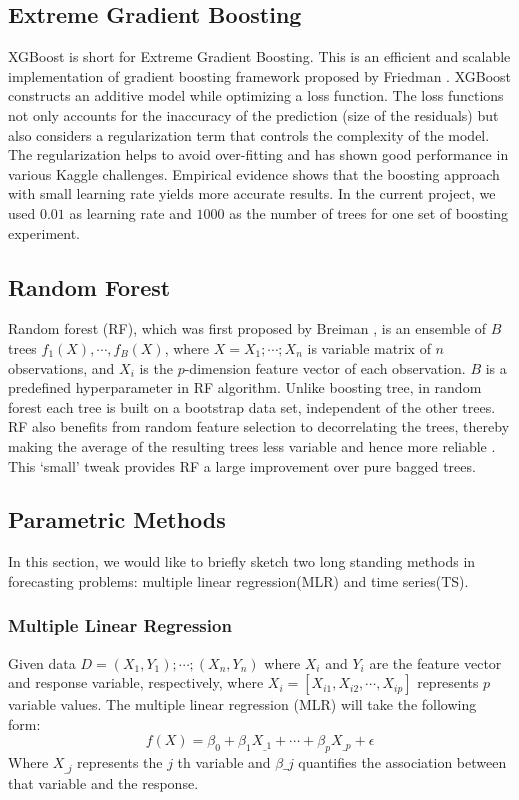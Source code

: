 \documentclass{llncs}
\begin{document}
\subsection{Extreme Gradient Boosting}
XGBoost \cite{Chen2016} is short for Extreme Gradient Boosting. This is an efficient and scalable implementation of gradient boosting framework proposed by Friedman \cite{Friedman2001}. XGBoost constructs an additive model while optimizing a loss function. The loss functions not only accounts for the inaccuracy of the prediction (size of the residuals) but also considers a regularization term that controls the complexity of the model. The regularization helps to avoid over-fitting and has shown good performance in various Kaggle challenges. Empirical evidence shows that the boosting approach with small learning rate yields more accurate results\cite{Chen2016}. In the current project, we used $0.01$ as learning rate and $1000$ as the number of trees for one set of boosting experiment.


\subsection{Random Forest}
Random forest (RF), which was first proposed by Breiman \cite{Breiman2001}, is an ensemble of $B$ trees $f_{1}(X), \cdots, f_{B}(X)$, where $X = X_{1}; \cdots; X_{n}$ is variable matrix of $n$ observations, and $X_{i}$ is the $p$-dimension feature vector of each observation. $B$ is a predefined hyperparameter in RF algorithm. Unlike boosting tree, in random forest each tree is built on a bootstrap data set, independent of the other trees. RF also benefits from random feature selection to decorrelating the trees, thereby making the average of the resulting trees less variable and hence more reliable \cite{James2013}. This `small' tweak provides RF a large improvement over pure bagged trees.


\subsection{Parametric Methods}
In this section, we would like to briefly sketch two long standing methods in forecasting problems: multiple linear regression(MLR) and time series(TS). 
\subsubsection{Multiple Linear Regression}
Given data $D = (X_{1}, Y_{1}); \cdots; (X_{n}, Y_{n})$ where $X_{i}$ and $Y_{i}$ are the feature vector and response variable, respectively, where $X_{i}= [X_{i1}, X_{i2}, \cdots, X_{ip}]$ represents $p$ variable values. The multiple linear regression (MLR) will take the following form:
\begin{equation}
f(X) = \beta_{0} + \beta_{1}X_{\_1} + \cdots + \beta_{p}X_{\_p} + \epsilon
\label{eq:linear1}
\end{equation}
Where $X_{\_j}$ represents the $j$ th variable and $\beta\_{j}$ quantifies the association between that variable and the response.
\end{document}
